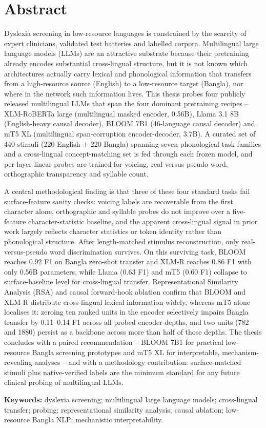 \section*{Abstract}

Dyslexia screening in low-resource languages is constrained by the scarcity of expert clinicians, validated test batteries and labelled corpora. Multilingual large language models (LLMs) are an attractive substrate because their pretraining already encodes substantial cross-lingual structure, but it is not known which architectures actually carry lexical and phonological information that transfers from a high-resource source (English) to a low-resource target (Bangla), nor where in the network such information lives. This thesis probes four publicly released multilingual LLMs that span the four dominant pretraining recipes -- XLM-RoBERTa large (multilingual masked encoder, 0.56B), Llama 3.1 8B (English-heavy causal decoder), BLOOM 7B1 (46-language causal decoder) and mT5 XL (multilingual span-corruption encoder-decoder, 3.7B). A curated set of 440 stimuli (220 English + 220 Bangla) spanning seven phonological task families and a cross-lingual concept-matching set is fed through each frozen model, and per-layer linear probes are trained for voicing, real-versus-pseudo word, orthographic transparency and syllable count.

A central methodological finding is that three of these four standard tasks fail surface-feature sanity checks: voicing labels are recoverable from the first character alone, orthographic and syllable probes do not improve over a five-feature character-statistic baseline, and the apparent cross-lingual signal in prior work largely reflects character statistics or token identity rather than phonological structure. After length-matched stimulus reconstruction, only real-versus-pseudo word discrimination survives. On this surviving task, BLOOM reaches 0.92 F1 on Bangla zero-shot transfer and XLM-R reaches 0.86 F1 with only 0.56B parameters, while Llama (0.63 F1) and mT5 (0.60 F1) collapse to surface-baseline level for cross-lingual transfer. Representational Similarity Analysis (RSA) and causal forward-hook ablation confirm that BLOOM and XLM-R distribute cross-lingual lexical information widely, whereas mT5 alone localises it: zeroing ten ranked units in the encoder selectively impairs Bangla transfer by 0.11--0.14 F1 across all probed encoder depths, and two units (782 and 1880) persist as a backbone across more than half of those depths. The thesis concludes with a paired recommendation -- BLOOM 7B1 for practical low-resource Bangla screening prototypes and mT5 XL for interpretable, mechanism-revealing analyses -- and with a methodology contribution: surface-matched stimuli plus native-verified labels are the minimum standard for any future clinical probing of multilingual LLMs.

\vspace{1cm}
\textbf{Keywords:} dyslexia screening; multilingual large language models; cross-lingual transfer; probing; representational similarity analysis; causal ablation; low-resource Bangla NLP; mechanistic interpretability.
\pagebreak
